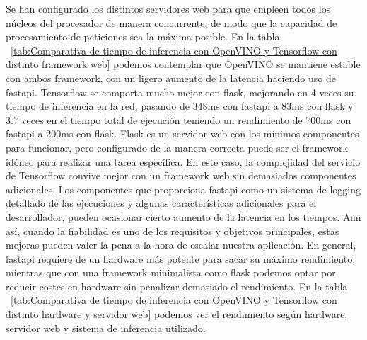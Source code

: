 Se han configurado los distintos servidores web para que empleen todos los núcleos del procesador de manera concurrente, de modo que la capacidad de procesamiento de peticiones sea la máxima posible.
En la tabla ~\ref{tab:Comparativa de tiempo de inferencia con OpenVINO y Tensorflow con distinto framework web} podemos contemplar que OpenVINO se mantiene estable con ambos framework, con un ligero aumento de la latencia haciendo uso de fastapi.
Tensorflow se comporta mucho mejor con flask, mejorando en 4 veces su tiempo de inferencia en la red, pasando de 348ms con fastapi a 83ms con flask y 3.7 veces en el tiempo total de ejecución teniendo un rendimiento de 700ms con fastapi a 200ms con flask.
Flask es un servidor web con los mínimos componentes para funcionar, pero configurado de la manera correcta puede ser el framework idóneo para realizar una tarea específica.
En este caso, la complejidad del servicio de Tensorflow convive mejor con un framework web sin demasiados componentes adicionales.
Los componentes que proporciona fastapi como un sistema de logging detallado de las ejecuciones y algunas características adicionales para el desarrollador, pueden ocasionar cierto aumento de la latencia en los tiempos.
Aun así, cuando la fiabilidad es uno de los requisitos y objetivos principales, estas mejoras pueden valer la pena a la hora de escalar nuestra aplicación.
En general, fastapi requiere de un hardware más potente para sacar su máximo rendimiento, mientras que con una framework minimalista como flask podemos optar por reducir costes en hardware sin penalizar demasiado el rendimiento.
En la tabla ~\ref{tab:Comparativa de tiempo de inferencia con OpenVINO y Tensorflow con distinto hardware y servidor web} podemos ver el rendimiento según hardware, servidor web y sistema de inferencia utilizado.


